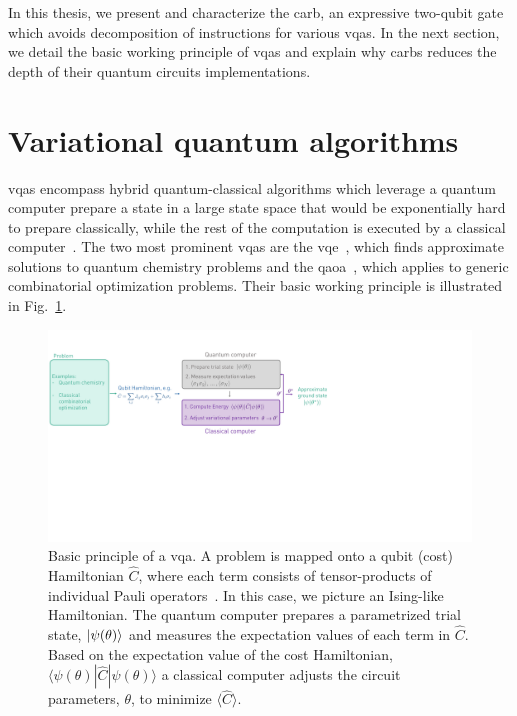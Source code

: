 In this thesis, we present and characterize the \gls{carb}, an expressive two-qubit gate which avoids decomposition of instructions for various \glspl{vqa}. In the next section, we detail the basic working principle of \glspl{vqa} and explain why \glspl{carb} reduces the depth of their quantum circuits implementations.

\section{Variational quantum algorithms}
\Glspl{vqa} encompass hybrid quantum-classical algorithms which leverage a quantum computer prepare a state in a large state space that would be exponentially hard to prepare classically, while the rest of the computation is executed by a classical computer~\cite{Moll2017QuantumDevices}. The two most prominent \glspl{vqa} are the \gls{vqe}~\cite{Peruzzo2014AProcessor}, which finds approximate solutions to quantum chemistry problems and the \gls{qaoa}~\cite{Farhi2014AAlgorithm}, which applies to generic combinatorial optimization problems. Their basic working principle is illustrated in Fig.~\ref{fig:intro_vqa}.

\begin{figure}[b]
    \centering
    \includegraphics[width=\textwidth, trim={0cm 18cm 26cm 2cm},clip]{variational_quantum_algorithms_v2.pdf}
    \caption{Basic principle of a \gls{vqa}. A problem is mapped onto a qubit (cost) Hamiltonian $\hat C$,  where each term consists of tensor-products of individual Pauli operators~\cite[p.~65]{Nielsen2000QuantumInformation}. In this case, we picture an Ising-like Hamiltonian. The quantum computer prepares a parametrized trial state, $\ket{\psi(\theta)}$ and measures the expectation values of each term in $\hat C$. Based on the expectation value of the cost Hamiltonian, $\langle \psi(\theta) | \hat C |  \psi(\theta) \rangle$ a classical computer adjusts the circuit parameters, $\theta$, to minimize $\langle \hat C \rangle$.}
    \label{fig:intro_vqa}
\end{figure}

